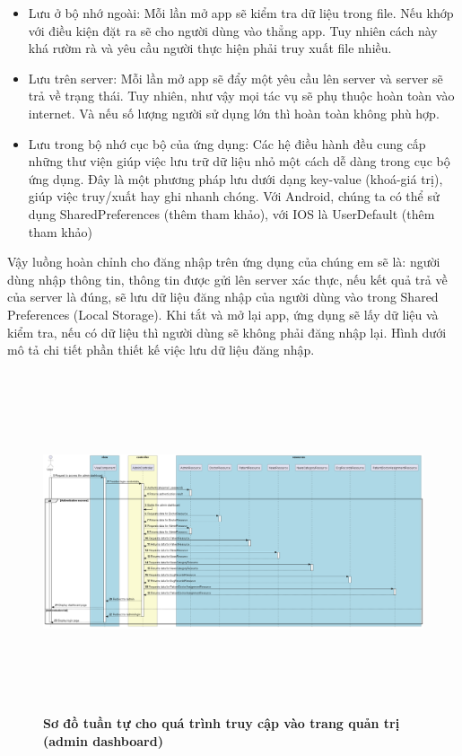 \begin{itemize}
  \item Lưu ở bộ nhớ ngoài: Mỗi lần mở app sẽ kiểm tra dữ liệu trong file. Nếu khớp với điều kiện đặt ra sẽ cho người dùng vào thẳng app.
  Tuy nhiên cách này khá rườm rà và yêu cầu người thực hiện phải truy xuất file nhiều.
  \item Lưu trên server: Mỗi lần mở app sẽ đẩy một yêu cầu lên server và server sẽ trả về trạng thái. Tuy nhiên, như vậy mọi tác
  vụ sẽ phụ thuộc hoàn toàn vào internet. Và nếu số lượng người sử dụng lớn thì hoàn toàn không phù hợp.
  \item Lưu trong bộ nhớ cục bộ của ứng dụng: Các hệ điều hành đều cung cấp những thư viện giúp việc lưu trữ dữ liệu nhỏ một cách 
  dễ dàng trong cục bộ ứng dụng. Đây là một phương pháp lưu dưới dạng key-value (khoá-giá trị), giúp việc truy/xuất hay ghi nhanh chóng.
  Với Android, chúng ta có thể sử dụng SharedPreferences (thêm tham khảo), với IOS là UserDefault (thêm tham khảo)

\end{itemize}
Vậy luồng hoàn chỉnh cho đăng nhập trên ứng dụng của chúng em sẽ là: người dùng nhập thông tin, thông tin được gửi lên server xác thực,
nếu kết quả trả về của server là đúng, sẽ lưu dữ liệu đăng nhập của người dùng vào trong Shared Preferences (Local Storage). Khi tắt và mở lại app,
ứng dụng sẽ lấy dữ liệu và kiểm tra, nếu có dữ liệu thì người dùng sẽ không phải đăng nhập lại. Hình dưới mô tả chi tiết phần thiết
kế việc lưu dữ liệu đăng nhập.

\begin{figure}[H]
  \centering
  \includegraphics[width=16cm,height=10cm]{Images/server/sequence/web/seq_auth.png}
  \caption[Sơ đồ tuần tự cho quá trình truy cập vào trang quản trị (admin dashboard) ]{\bfseries \fontsize{12pt}{0pt}
  \selectfont Sơ đồ tuần tự cho quá trình truy cập vào trang quản trị (admin dashboard) }
  \label{seq_auth} %
\end{figure}

